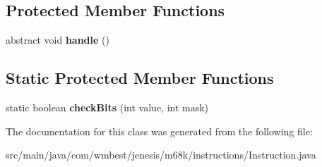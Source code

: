 \subsection*{Protected Member Functions}
\begin{DoxyCompactItemize}
\item 
\hypertarget{classcom_1_1wmbest_1_1jenesis_1_1m68k_1_1instructions_1_1Instruction_ad65cf811ce02795e7b84db158457871b}{abstract void {\bfseries handle} ()}\label{classcom_1_1wmbest_1_1jenesis_1_1m68k_1_1instructions_1_1Instruction_ad65cf811ce02795e7b84db158457871b}

\end{DoxyCompactItemize}
\subsection*{Static Protected Member Functions}
\begin{DoxyCompactItemize}
\item 
\hypertarget{classcom_1_1wmbest_1_1jenesis_1_1m68k_1_1instructions_1_1Instruction_aa7934428325b635ba443aadce472afb2}{static boolean {\bfseries check\-Bits} (int value, int mask)}\label{classcom_1_1wmbest_1_1jenesis_1_1m68k_1_1instructions_1_1Instruction_aa7934428325b635ba443aadce472afb2}

\end{DoxyCompactItemize}


The documentation for this class was generated from the following file\-:\begin{DoxyCompactItemize}
\item 
src/main/java/com/wmbest/jenesis/m68k/instructions/Instruction.\-java\end{DoxyCompactItemize}
